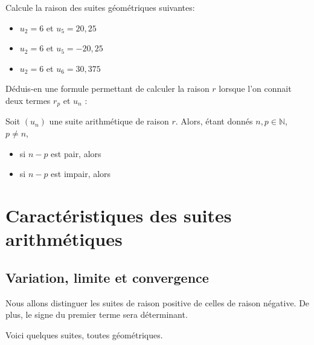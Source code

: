 \documentclass[a4paper,12pt]{report}
\newcommand{\IN}{\mathbb{N}}
\begin{document}
Calcule la raison des suites géométriques suivantes:

\begin{itemize}
\item \(u_2=6\) et \(u_5=20,25\)
\end{itemize}
\dotfill

\dotfill

\dotfill

\begin{itemize}
\item \(u_2=6\) et \(u_5=-20,25\)
\end{itemize}
\dotfill

\dotfill

\dotfill

\begin{itemize}
\item \(u_2=6\) et \(u_6=30,375\)
\end{itemize}
\dotfill

\dotfill

\dotfill

Déduis-en une formule permettant de calculer la raison \(r\) lorsque l’on connait deux termes
\(r_p\) et \(u_n\) :
\begin{propriete}


Soit \((u_n)\) une suite arithmétique de raison \(r\). Alors, étant donnés
\(n,p\in\IN\), \(p\neq n\),

\begin{itemize}
\item si \(n-p\) est pair, alors \dotfill

\item si \(n-p\) est impair, alors \dotfill
\end{itemize}
\end{propriete}

\section{Caractéristiques des suites arithmétiques}
\label{sec:orgb891dd6}

\subsection{Variation, limite et convergence}
\label{sec:orgd93c37e}
Nous allons distinguer les suites de raison positive de celles de
raison négative. De plus, le signe du premier terme sera déterminant.

Voici quelques suites, toutes géométriques.
\end{document}
